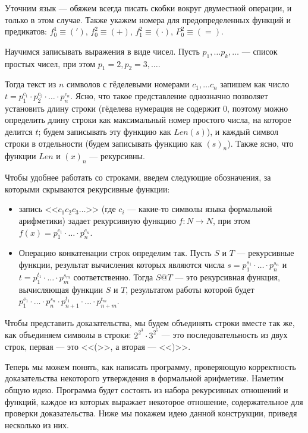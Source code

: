 Уточним язык --- обяжем всегда писать скобки вокруг двуместной
операции, и только в этом случае. 
Также укажем номера для предопределенных функций и предикатов:
$f_0^1 \equiv (')$, $f_0^2 \equiv (+)$, $f_1^2 \equiv (\cdot)$, $P_0^2 \equiv (=)$.

Научимся записывать выражения в виде чисел. Пусть $p_1, \dots p_k, \dots$ --- список простых
чисел, при этом $p_1 = 2, p_2 = 3, \dots$. 

Тогда текст из $n$ символов с гёделевыми номерами $c_1, \dots c_n$ запишем как число
$t = p_1^{c_1} \cdot p_2^{c_2} \cdot \dots \cdot p_n^{c_n}$. Ясно, что такое представление
однозначно позволяет установить длину строки (гёделева нумерация не содержит 0, поэтому
можно определить длину строки как максимальный номер простого числа, на которое делится $t$;
будем записывать эту функцию как $\mathit{Len}(s)$),
и каждый символ строки в отдельности (будем записывать функцию как $(s)_n$).
Также ясно, что функции $\mathit{Len}$ и $(x)_n$ --- рекурсивны.

Чтобы удобнее работать со строками, введем следующие обозначения, за которыми скрываются
рекурсивные функции:

\begin{itemize}
\item запись $\texttt{<<}c_1 c_2 c_3 \dots \texttt{>>}$ (где $c_i$ --- какие-то символы языка формальной арифметики)
задает рекурсивную функцию $f: N \rightarrow N$, при этом $f(x) = p_1^{c_1} \cdot \dots \cdot p_n^{c_n}$.

\item Операцию конкатенации строк определим так. Пусть $S$ и $T$ --- рекурсивные функции,
результат вычисления которых являются числа $s = p_1^{s_1} \cdot \dots \cdot p_n^{s_n}$ и
$t = p_1^{t_1} \cdot \dots \cdot p_m^{s_m}$ соответственно. 
Тогда $S @ T$ --- это рекурсивная функция, вычисляющая функции $S$ и $T$, 
результатом работы которой будет
$p_1^{s_1} \cdot \dots \cdot p_n^{s_n} \cdot p_{n+1}^{t_1} \cdot \dots \cdot p_{n+m}^{t_m}$.

\end{itemize}

Чтобы представить доказательства, мы будем объединять строки вместе так же, как
объединяем символы в строки: $2^{2^3} \cdot 3^{2^5}$ --- это последовательность
из двух строк, первая --- это <<(>>, а вторая --- <<)>>.

Теперь мы можем понять, как написать программу, проверяющую корректность доказательства 
некоторого утверждения в формальной арифметике. Наметим общую идею. Программа будет состоять из набора
рекурсивных отношений и функций, каждое из которых выражает некоторое 
отношение, содержательное для проверки доказательства. Ниже мы покажем идею 
данной конструкции, приведя несколько из них.

